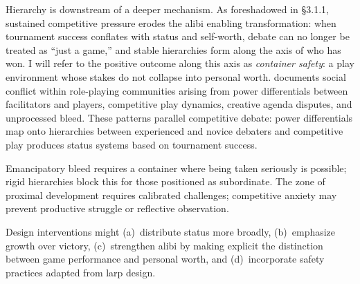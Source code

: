 Hierarchy is downstream of a deeper mechanism. As foreshadowed in §3.1.1, sustained competitive pressure erodes the alibi enabling transformation: when tournament success conflates with status and self-worth, debate can no longer be treated as ``just a game,'' and stable hierarchies form along the axis of who has won. I will refer to the positive outcome along this axis as \textit{container safety}: a play environment whose stakes do not collapse into personal worth. \textcite{bowman2013social} documents social conflict within role-playing communities arising from power differentials between facilitators and players, competitive play dynamics, creative agenda disputes, and unprocessed bleed. These patterns parallel competitive debate: power differentials map onto hierarchies between experienced and novice debaters and competitive play produces status systems based on tournament success.

Emancipatory bleed requires a container where being taken seriously is possible; rigid hierarchies block this for those positioned as subordinate. The zone of proximal development requires calibrated challenges; competitive anxiety may prevent productive struggle or reflective observation.

Design interventions might (a)~distribute status more broadly, (b)~emphasize growth over victory, (c)~strengthen alibi by making explicit the distinction between game performance and personal worth, and (d)~incorporate safety practices adapted from larp design.


